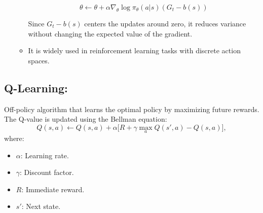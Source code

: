 \documentclass[12pt,a4paper]{article}
\begin{document}
\begin{enumerate}
\begin{itemize}
\[
\theta \leftarrow \theta + \alpha \nabla_{\theta} \log \pi_{\theta}(a | s) (G_t - b(s))
\]

Since \( G_t - b(s) \) centers the updates around zero, it reduces variance without changing the expected value of the gradient.

        \item It is widely used in reinforcement learning tasks with discrete action spaces.
    \end{itemize}
\end{enumerate}
\subsection{Q-Learning:} Off-policy algorithm that learns the optimal policy by maximizing future rewards. The Q-value is updated using the Bellman equation:
        \[
        Q(s, a) \gets Q(s, a) + \alpha \big[ R + \gamma \max_a Q(s', a) - Q(s, a) \big],
        \]
        where:
        \begin{itemize}
            \item \( \alpha \): Learning rate.
            \item \( \gamma \): Discount factor.
            \item \( R \): Immediate reward.
            \item \( s' \): Next state.
        \end{itemize}
\end{document}

